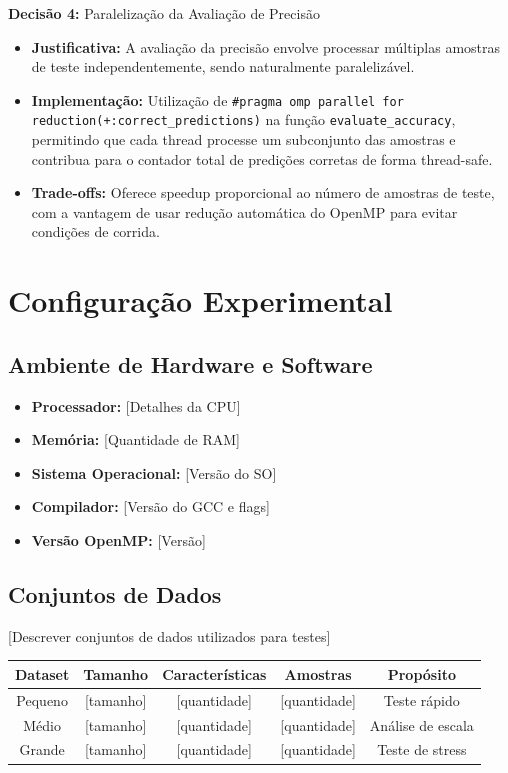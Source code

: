 \documentclass[a4paper,11pt]{article}
\begin{document}
\textbf{Decisão 4:} Paralelização da Avaliação de Precisão
\begin{itemize}
    \item \textbf{Justificativa:} A avaliação da precisão envolve processar múltiplas amostras de teste independentemente, sendo naturalmente paralelizável.
    \item \textbf{Implementação:} Utilização de \texttt{\#pragma omp parallel for reduction(+:correct\_predictions)} na função \texttt{evaluate\_accuracy}, permitindo que cada thread processe um subconjunto das amostras e contribua para o contador total de predições corretas de forma thread-safe.
    \item \textbf{Trade-offs:} Oferece speedup proporcional ao número de amostras de teste, com a vantagem de usar redução automática do OpenMP para evitar condições de corrida.
\end{itemize}

\section{Configuração Experimental}

\subsection{Ambiente de Hardware e Software}
\begin{itemize}
    \item \textbf{Processador:} [Detalhes da CPU]
    \item \textbf{Memória:} [Quantidade de RAM]
    \item \textbf{Sistema Operacional:} [Versão do SO]
    \item \textbf{Compilador:} [Versão do GCC e flags]
    \item \textbf{Versão OpenMP:} [Versão]
\end{itemize}

\subsection{Conjuntos de Dados}
[Descrever conjuntos de dados utilizados para testes]

\begin{table}[H]
\centering
\begin{tabular}{|c|c|c|c|c|}
\hline
\textbf{Dataset} & \textbf{Tamanho} & \textbf{Características} & \textbf{Amostras} & \textbf{Propósito} \\
\hline
Pequeno & [tamanho] & [quantidade] & [quantidade] & Teste rápido \\
\hline
Médio & [tamanho] & [quantidade] & [quantidade] & Análise de escala \\
\hline
Grande & [tamanho] & [quantidade] & [quantidade] & Teste de stress \\
\hline
\end{tabular}
\end{table}
\end{document}
